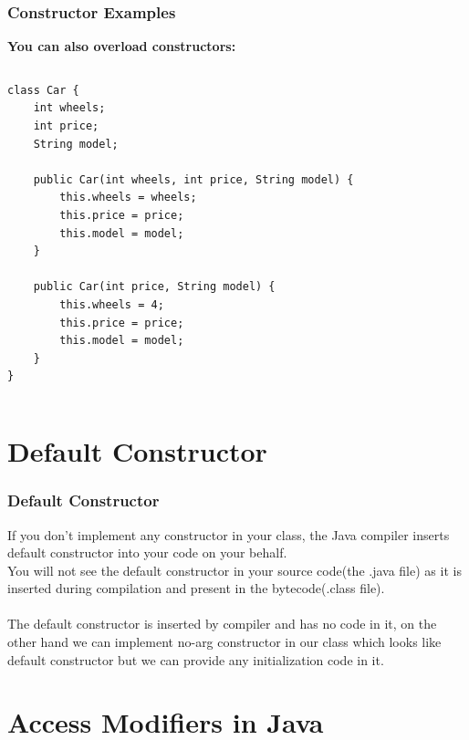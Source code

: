 \documentclass{beamer}
\begin{document}
\begin{frame}[fragile]
\frametitle{Constructor Examples}
\textbf{You can also overload constructors:}
\begin{columns}[T]
\begin{column}{\textwidth}
\begin{lstlisting}
class Car {
    int wheels;
    int price;
    String model;

    public Car(int wheels, int price, String model) {
        this.wheels = wheels;
        this.price = price;
        this.model = model;
    }

    public Car(int price, String model) {
        this.wheels = 4;
        this.price = price;
        this.model = model;
    }
}

\end{lstlisting}
\end{column}
\end{columns}
\end{frame}



\section{Default Constructor}

\begin{frame}
\frametitle{Default Constructor}
If you don’t implement any constructor in your class, the Java compiler inserts default constructor into your code on your behalf. \\You will not see the default constructor in your source code(the .java file) as it is inserted during compilation and present in the bytecode(.class file).\\~\\
The default constructor is inserted by compiler and has no code in it, on the other hand we can implement no-arg constructor in our class which looks like default constructor but we can provide any initialization code in it.
\end{frame}




\section{Access Modifiers in Java}
\end{document}
